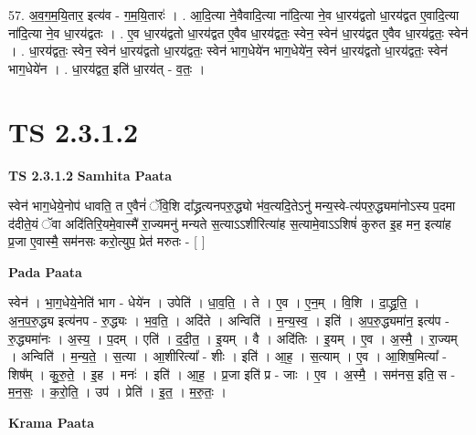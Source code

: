 \documentclass[17pt]{extarticle}
\begin{document}
57. अ॒व॒ग॒म॒यि॒तार॒ इत्य॑व - ग॒म॒यि॒तारः॑ । . आ॒दि॒त्या ने॒वैवादि॒त्या ना॑दि॒त्या ने॒व धा॒रय॑द्वतो धा॒रय॑द्वत ए॒वादि॒त्या ना॑दि॒त्या ने॒व धा॒रय॑द्वतः । . ए॒व धा॒रय॑द्वतो धा॒रय॑द्वत ए॒वैव धा॒रय॑द्वतः॒ स्वेन॒ स्वेन॑ धा॒रय॑द्वत ए॒वैव धा॒रय॑द्वतः॒ स्वेन॑ । . धा॒रय॑द्वतः॒ स्वेन॒ स्वेन॑ धा॒रय॑द्वतो धा॒रय॑द्वतः॒ स्वेन॑ भाग॒धेये॑न भाग॒धेये॑न॒ स्वेन॑ धा॒रय॑द्वतो धा॒रय॑द्वतः॒ स्वेन॑ भाग॒धेये॑न । . धा॒रय॑द्वत॒ इति॑ धा॒रय॑त् - व॒तः॒ । \newline
\pagebreak
{}
\section*{ TS 2.3.1.2 }

\textbf{TS 2.3.1.2 } \newline
\textbf{Samhita Paata} \newline

स्वेन॑ भाग॒धेये॒नोप॑ धावति॒ त ए॒वैनं॑ ॅवि॒शि दा᳚द्ध्रत्यनपरु॒द्ध्यो भ॑व॒त्यदि॒तेऽनु॑ मन्य॒स्वे-त्य॑परु॒द्ध्यमा॑नोऽस्य प॒दमा द॑दीते॒यं ॅवा अदि॑तिरि॒यमे॒वास्मै॑ रा॒ज्यमनु॑ मन्यते स॒त्याऽऽशीरित्या॑ह स॒त्यामे॒वाऽऽशिषं॑ कुरुत इ॒ह मन॒ इत्या॑ह प्र॒जा ए॒वास्मै॒ सम॑नसः करो॒त्युप॒ प्रेत॑ मरुतः - [  ] \newline

\textbf{Pada Paata} \newline

स्वेन॑ । भा॒ग॒धेये॒नेति॑ भाग - धेये॑न । उपेति॑ । धा॒व॒ति॒ । ते । ए॒व । ए॒न॒म् । वि॒शि । दा॒द्ध्र॒ति॒ । अ॒न॒प॒रु॒द्ध्य इत्य॑नप - रु॒द्ध्यः । भ॒व॒ति॒ । अदि॑ते । अन्विति॑ । म॒न्य॒स्व॒ । इति॑ । अ॒प॒रु॒द्ध्यमा॑न॒ इत्य॑प - रु॒द्ध्यमा॑नः । अ॒स्य॒ । प॒दम् । एति॑ । द॒दी॒त॒ । इ॒यम् । वै । अदि॑तिः । इ॒यम् । ए॒व । अ॒स्मै॒ । रा॒ज्यम् । अन्विति॑ । म॒न्य॒ते॒ । स॒त्या । आ॒शीरित्या᳚ - शीः । इति॑ । आ॒ह॒ । स॒त्याम् । ए॒व । आ॒शिष॒मित्या᳚ - शिष᳚म् । कु॒रु॒ते॒ । इ॒ह । मनः॑ । इति॑ । आ॒ह॒ । प्र॒जा इति॑ प्र - जाः । ए॒व । अ॒स्मै॒ । सम॑नस॒ इति॒ स - म॒न॒सः॒ । क॒रो॒ति॒ । उप॑ । प्रेति॑ । इ॒त॒ । म॒रु॒तः॒ ।  \newline


\textbf{Krama Paata} \newline
\end{document}
